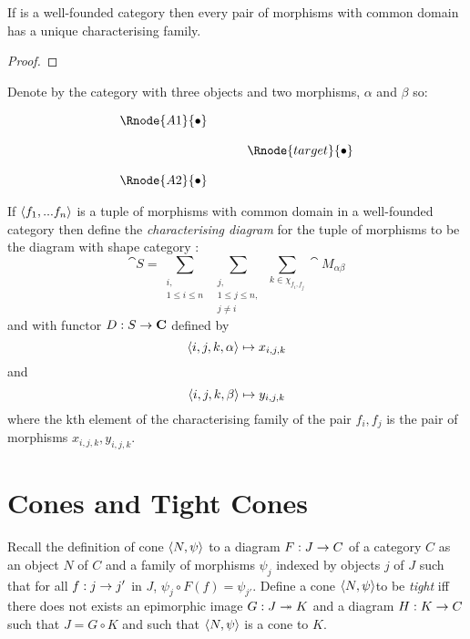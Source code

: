 \documentclass[10pt,a4paper]{article}
\begin{document}
\begin{lemma}
 If  is a well-founded category then every pair of morphisms with common domain has a unique characterising family.
\end{lemma}
\begin{proof}
\end{proof}
\begin{definition}
Denote by  the category with three objects and two morphisms, $\alpha$ and $\beta$ so:


\begin{center}
\begin{displaymath}
\begin{array}{cp{0.4cm} c}
\Rnode{A1}{\bullet}                  \\ [0.4cm]
                & & \Rnode{target}{\bullet} \\ [0.4cm]
\Rnode{A2}{\bullet} 
\end{array}
\end{displaymath}
\end{center}
\end{definition}

\begin{definition}
If $\left\langle f_1,...f_n\right\rangle$ is a tuple of morphisms with common domain in a well-founded category  then define the \textit{characterising diagram} for the tuple of morphisms
to be the diagram with shape category :
$$\cat{S}=\sum_{\substack{i,\\1 \leq i \leq n}} \  \sum_{\substack{j,\\ 1 \leq j \leq n,\\ j \neq i}} \ \sum_{k \in \chi_{f_i,f_j}} \cat{M}_{\alpha\beta}$$
and with functor $D: S \rightarrow \textbf{C}$ defined by
$$ \left\langle i,j,k,\alpha\right\rangle   \mapsto x_{i,j,k}$$
and
$$ \left\langle i,j,k,\beta\right\rangle   \mapsto y_{i,j,k}$$
where the kth element of the characterising family of the pair $f_i,f_j$ is the  pair of  morphisms $x_{i,j,k}, y_{i,j,k}$.
\end{definition}

\section{Cones and Tight Cones}
Recall the definition of cone $\left\langle N,\psi\right\rangle$ to a diagram $F:J \rightarrow C$ of a category $C$ as an object $N$ of $C$ and a family of morphisms $\psi_j$ indexed by objects $j$ of $J$ such that for all $f: j \rightarrow j'$ in $J$, $\psi_j \circ F(f) = \psi_{j'}$. Define a cone $\left\langle N,\psi\right\rangle$to be \textit{tight} iff there does not exists an epimorphic image $G: J \twoheadrightarrow K$ and a diagram $H:K \rightarrow C$ such that $J=G \circ K$ and such that $\left\langle N,\psi\right\rangle$ is a cone to $K$.
\end{document}
